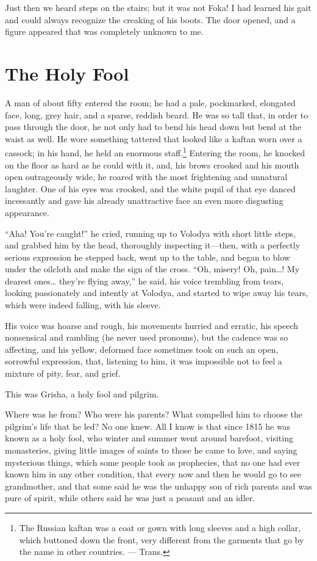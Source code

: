 Just then we heard steps on the stairs; but it was not Foka! I had learned his gait and could always recognize the creaking of his boots. The door opened, and a figure appeared that was completely unknown to me.

\chapter{The Holy Fool}

A man of about fifty entered the room; he had a pale, pockmarked, elongated face, long, grey hair, and a sparse, reddish beard. He was so tall that, in order to pass through the door, he not only had to bend his head down but bend at the waist as well. He wore something tattered that looked like a kaftan worn over a cassock; in his hand, he held an enormous staff.\footnote{The Russian kaftan was a coat or gown with long sleeves and a high collar, which buttoned down the front, very different from the garments that go by the name in other countries. --- Trans.} Entering the room, he knocked on the floor as hard as he could with it, and, his brows crooked and his mouth open outrageously wide, he roared with the most frightening and unnatural laughter. One of his eyes was crooked, and the white pupil of that eye danced incessantly and gave his already unattractive face an even more disgusting  appearance.

``Aha! You're caught!'' he cried, running up to Volodya with short little steps, and grabbed him by the head, thoroughly inspecting it---then, with a perfectly serious expression he stepped back, went up to the table, and began to blow under the oilcloth and make the sign of the cross. ``Oh, misery! Oh, pain\ldots{}! My dearest ones\ldots{} they're flying away,'' he said, his voice trembling from tears, looking passionately and intently at Volodya, and started to wipe away his tears, which were indeed falling, with his sleeve. %

His voice was hoarse and rough, his movements hurried and erratic, his speech nonsensical and rambling (he never used pronouns), but the cadence was so affecting, and his yellow, deformed face sometimes took on such an open, sorrowful expression, that, listening to him, it was impossible not to feel a mixture of pity, fear, and grief.

This was Grisha, a holy fool and pilgrim.

Where was he from? Who were his parents? What compelled him to choose the pilgrim's life that he led? No one knew. All I know is that since 1815  he was known as a holy fool, who winter and summer went around barefoot, visiting monasteries, giving little images of saints  to those he came to love, and saying mysterious things, which some people took as prophecies, that no one had ever known him in any other condition, that every now and then he would go to see grandmother, and that some said he was the unhappy son of rich parents and was pure of spirit, while others said he was just a peasant and an idler.

